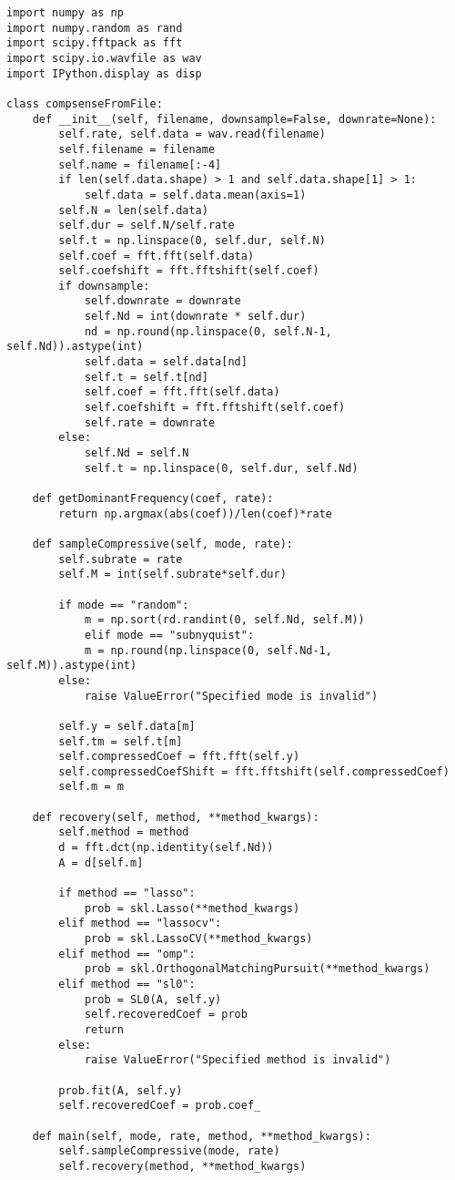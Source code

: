 \begin{lstlisting}
import numpy as np
import numpy.random as rand
import scipy.fftpack as fft
import scipy.io.wavfile as wav
import IPython.display as disp

class compsenseFromFile:
	def __init__(self, filename, downsample=False, downrate=None):
		self.rate, self.data = wav.read(filename)
		self.filename = filename
		self.name = filename[:-4]
		if len(self.data.shape) > 1 and self.data.shape[1] > 1:
			self.data = self.data.mean(axis=1)
		self.N = len(self.data)
		self.dur = self.N/self.rate
		self.t = np.linspace(0, self.dur, self.N)
		self.coef = fft.fft(self.data)
		self.coefshift = fft.fftshift(self.coef)
		if downsample:
			self.downrate = downrate
			self.Nd = int(downrate * self.dur)
			nd = np.round(np.linspace(0, self.N-1, self.Nd)).astype(int)
			self.data = self.data[nd]
			self.t = self.t[nd]
			self.coef = fft.fft(self.data)
			self.coefshift = fft.fftshift(self.coef)
			self.rate = downrate
		else:
			self.Nd = self.N
			self.t = np.linspace(0, self.dur, self.Nd)
			
	def getDominantFrequency(coef, rate):
		return np.argmax(abs(coef))/len(coef)*rate
	
	def sampleCompressive(self, mode, rate):
		self.subrate = rate
		self.M = int(self.subrate*self.dur)
	
		if mode == "random":
			m = np.sort(rd.randint(0, self.Nd, self.M))
			elif mode == "subnyquist":
			m = np.round(np.linspace(0, self.Nd-1, self.M)).astype(int)
		else:
			raise ValueError("Specified mode is invalid")
		
		self.y = self.data[m]
		self.tm = self.t[m]
		self.compressedCoef = fft.fft(self.y)
		self.compressedCoefShift = fft.fftshift(self.compressedCoef)
		self.m = m

	def recovery(self, method, **method_kwargs):
		self.method = method
		d = fft.dct(np.identity(self.Nd))
		A = d[self.m]
		
		if method == "lasso":
			prob = skl.Lasso(**method_kwargs)
		elif method == "lassocv":
			prob = skl.LassoCV(**method_kwargs)
		elif method == "omp":
			prob = skl.OrthogonalMatchingPursuit(**method_kwargs)
		elif method == "sl0":
			prob = SL0(A, self.y)
			self.recoveredCoef = prob
			return
		else:
			raise ValueError("Specified method is invalid")
		
		prob.fit(A, self.y)
		self.recoveredCoef = prob.coef_
	
	def main(self, mode, rate, method, **method_kwargs):
		self.sampleCompressive(mode, rate)
		self.recovery(method, **method_kwargs)
\end{lstlisting}


